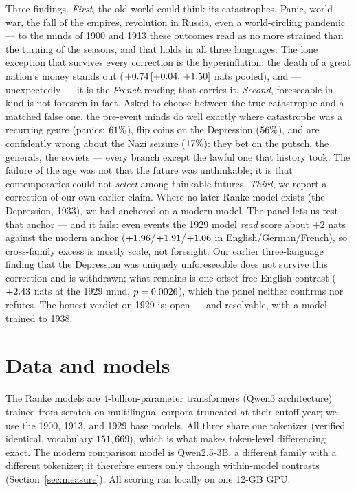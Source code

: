\documentclass[11pt]{article}
\begin{document}
Three findings. \emph{First}, the old world could think its catastrophes. Panic, world war, the fall of
the empires, revolution in Russia, even a world-circling pandemic --- to the minds of 1900 and 1913 these
outcomes read as no more strained than the turning of the seasons, and that holds in all three languages.
The lone exception that survives every correction is the hyperinflation: the death of a great nation's
money stands out ($+0.74\,[+0.04,\,+1.50]$ nats pooled), and --- unexpectedly --- it is the \emph{French} reading that
carries it. \emph{Second}, foreseeable in kind is not foreseen in fact. Asked to choose between the true
catastrophe and a matched false one, the pre-event minds do well exactly where catastrophe was a recurring
genre (panics: $61\%$), flip coins on the Depression ($56\%$), and are confidently wrong
about the Nazi seizure ($17\%$): they bet on the putsch, the generals, the soviets --- every
branch except the lawful one that history took. The failure of the age was not that the future was
unthinkable; it is that contemporaries could not \emph{select} among thinkable futures. \emph{Third}, we
report a correction of our own earlier claim. Where no later Ranke model exists (the Depression, 1933), we
had anchored on a modern model. The panel lets us test that anchor --- and it fails: even events the 1929
model \emph{read} score about $+2$ nats against the modern anchor ($+1.96$/$+1.91$/$+1.06$
in English/German/French), so cross-family excess is mostly scale, not foresight. Our earlier
three-language finding that the Depression was uniquely unforeseeable does not survive this correction and
is withdrawn; what remains is one offset-free English contrast ($+2.43$ nats at the 1929 mind,
$p=0.0026$), which the panel neither confirms nor refutes. The honest verdict on 1929 is: open ---
and resolvable, with a model trained to 1938.

\section{Data and models}\label{sec:data}

The Ranke models are 4-billion-parameter transformers (Qwen3 architecture) trained from scratch on
multilingual corpora truncated at their cutoff year; we use the 1900, 1913, and 1929 base models. All
three share one tokenizer (verified identical, vocabulary $151{,}669$), which is what makes token-level
differencing exact. The modern comparison model is Qwen2.5-3B, a different family with a different
tokenizer; it therefore enters only through within-model contrasts (Section~\ref{sec:measure}). All
scoring ran locally on one 12-GB GPU.
\end{document}
